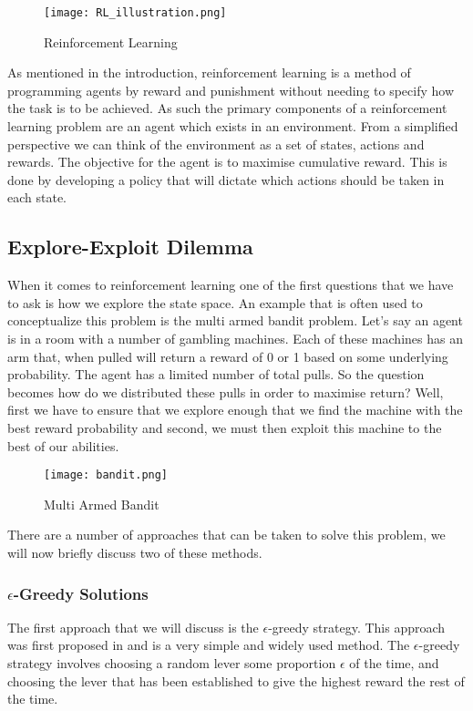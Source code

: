 \begin{figure}[ht]
    \texttt{[image: RL\_illustration.png]}
    \caption{Reinforcement Learning}
\end{figure}

As mentioned in the introduction, reinforcement learning is a method of programming agents by reward and
punishment without needing to specify how the task is to be achieved.
As such the primary components of a reinforcement learning problem are an agent which exists in an environment.
From a simplified perspective we can think of the environment as a set of states, actions and rewards.
The objective for the agent is to maximise cumulative reward.
This is done by developing a policy that will dictate which actions should be taken in each state.

\subsection{Explore-Exploit Dilemma}\label{subsec:exploreExploit}
When it comes to reinforcement learning one of the first questions that we have to ask is how we explore
the state space.
An example that is often used to conceptualize this problem is the multi armed bandit problem.
Let's say an agent is in a room with a number of gambling machines.
Each of these machines has an arm that, when pulled will return a reward of 0 or 1 based on some underlying
probability\citep{kaelbling1996reinforcement}.
The agent has a limited number of total pulls.
So the question becomes how do we distributed these pulls in order to maximise return?
Well, first we have to ensure that we explore enough that we find the machine with the best reward probability
and second, we must then exploit this machine to the best of our abilities.

\begin{figure}[ht]
    \texttt{[image: bandit.png]}
    \caption{Multi Armed Bandit}
\end{figure}

There are a number of approaches that can be taken to solve this problem, we will now briefly discuss two of these
methods.

\subsubsection{$\epsilon$-Greedy Solutions}\label{subsec:eGreedy}
The first approach that we will discuss is the $\epsilon$-greedy strategy.
This approach was first proposed in\citep{watkins1989learning} and is a very simple and widely used method.
The $\epsilon$-greedy strategy involves choosing a random lever some proportion $\epsilon$ of the time, and
choosing the lever that has been established to give the highest reward the rest of the time.

